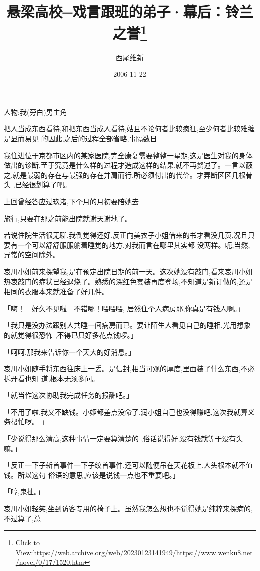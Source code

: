 \documentclass{article}
\title{悬梁高校─戏言跟班的弟子·幕后：铃兰之誉\footnote{Click to View:\url{https://web.archive.org/web/20230123141949/https://www.wenku8.net/novel/0/17/1520.htm}}}
\author{西尾维新}
\date{2006-11-22}
\begin{document}

\maketitle


\Large


﻿人物:我(旁白)男主角—— 

把人当成东西看待,和把东西当成人看待,姑且不论何者比较疯狂,至少何者比较难缠是显而易见
的因此,之后的过程全部省略,事隔数日 

我住进位于京都市区内的某家医院,完全康复需要整整一星期,这是医生对我的身体做出的诊断,至于究竟是什么样的过程才造成这样的结果,就不再赘述了。一言以蔽之,就是最弱的存在与最强的存在并肩而行,所必须付出的代价。才弄断区区几根骨头
,已经很划算了吧。 

上回曾经答应过玖渚,下个月的月初要陪她去

\newpage
旅行,只要在那之前能出院就谢天谢地了。 

若说住院生活很无聊,我倒觉得还好,反正向美衣子小姐借来的书才看没几页,况且只要有一个可以舒舒服服躺着睡觉的地方,对我而言在哪里其实都
没两样。呃,当然,异常的空间除外。 

哀川小姐前来探望我,是在预定出院日期的前一天。这次她没有敲门,看来哀川小姐热衷敲门的症状已经退烧了。熟悉的深红色套装再度登场,不知道是新订做的,还是相同的衣服本来就准备了好几件。
 

「嗨！~~好久不见啦~~不错哪！喂喂喂,
居然住个人病房耶,你真是有钱人啊。」 

「我只是没办法跟别人共睡一间病房而已。要让陌生人看见自己的睡相,光用想象的就觉得很恐怖
,不得已只好多花点钱啰。」 

「呵呵,那我来告诉你一个天大的好消息。」

\newpage

哀川小姐随手将东西往床上一丢。是信封,相当可观的厚度,里面装了什么东西,不必拆开看也知
道,根本无须多问。 


「就当作这次协助我完成任务的报酬吧。」 

「不用了啦,我又不缺钱。小姬都差点没命了,润小姐自己也没得赚吧,这次我就算义务帮忙啰。
」 

「少说得那么清高,这种事情一定要算清楚的
,俗话说得好,没有钱就等于没有头嘛。」 

「反正一下子斩首事件一下子绞首事件,还可以随便吊在天花板上,人头根本就不值钱。所以这句
俗语的意思,应该是说钱一点也不重要吧。」 


「哼,鬼扯。」 

哀川小姐轻笑,坐到访客专用的椅子上。虽然我怎么想也不觉得她是纯粹来探病的,不过算了,总
\newpage
\end{document}
